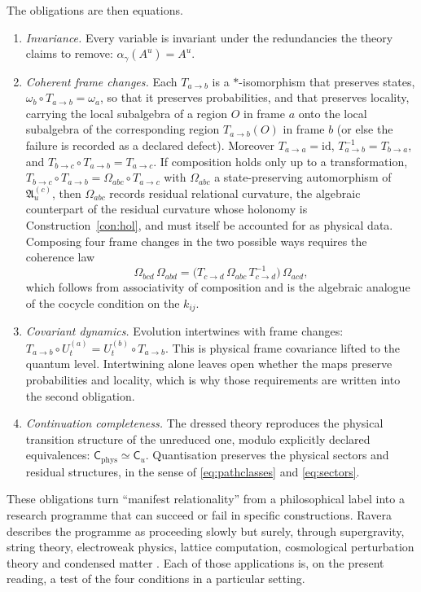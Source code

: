 \documentclass[11pt]{article}
\theoremstyle{plain}
\theoremstyle{definition}
\theoremstyle{remark}
\begin{document}
The obligations are then equations.
\begin{enumerate}
\item \emph{Invariance.} Every variable is invariant under the redundancies the theory claims to remove: $\alpha_\gamma(A^u)=A^u$.
\item \emph{Coherent frame changes.} Each $T_{a\to b}$ is a $*$-isomorphism that preserves states, $\omega_b\circ T_{a\to b}=\omega_a$, so that it preserves probabilities, and that preserves locality, carrying the local subalgebra of a region $O$ in frame $a$ onto the local subalgebra of the corresponding region $T_{a\to b}(O)$ in frame $b$ (or else the failure is recorded as a declared defect). Moreover $T_{a\to a}=\mathrm{id}$, $T_{a\to b}^{-1}=T_{b\to a}$, and $T_{b\to c}\circ T_{a\to b}=T_{a\to c}$. If composition holds only up to a transformation, $T_{b\to c}\circ T_{a\to b}=\Omega_{abc}\circ T_{a\to c}$ with $\Omega_{abc}$ a state-preserving automorphism of $\mathfrak A^{(c)}_u$, then $\Omega_{abc}$ records residual relational curvature, the algebraic counterpart of the residual curvature whose holonomy is Construction~\ref{con:hol}, and must itself be accounted for as physical data. Composing four frame changes in the two possible ways requires the coherence law
\begin{equation}
\Omega_{bcd}\,\Omega_{abd}=\big(T_{c\to d}\,\Omega_{abc}\,T_{c\to d}^{-1}\big)\,\Omega_{acd},
\end{equation}
which follows from associativity of composition and is the algebraic analogue of the cocycle condition on the $k_{ij}$.
\item \emph{Covariant dynamics.} Evolution intertwines with frame changes: $T_{a\to b}\circ U^{(a)}_t=U^{(b)}_t\circ T_{a\to b}$. This is physical frame covariance lifted to the quantum level. Intertwining alone leaves open whether the maps preserve probabilities and locality, which is why those requirements are written into the second obligation.
\item \emph{Continuation completeness.} The dressed theory reproduces the physical transition structure of the unreduced one, modulo explicitly declared equivalences: $\mathsf C_{\mathrm{phys}}\simeq\mathsf C_u$. Quantisation preserves the physical sectors and residual structures, in the sense of \eqref{eq:pathclasses} and \eqref{eq:sectors}.
\end{enumerate}
These obligations turn ``manifest relationality'' from a philosophical label into a research programme that can succeed or fail in specific constructions. Ravera describes the programme as proceeding slowly but surely, through supergravity, string theory, electroweak physics, lattice computation, cosmological perturbation theory and condensed matter \cite{toe}. Each of those applications is, on the present reading, a test of the four conditions in a particular setting.
\end{document}
